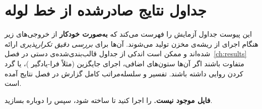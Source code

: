 \chapter{جداول نتایج صادرشده از خط لوله}
\label{app:pipeline_tables}

این پیوست جداول آزمایش را فهرست می‌کند که \textbf{به‌صورت خودکار} از خروجی‌های  زیر \texttt{} هنگام اجرای \texttt{} از ریشه‌ی مخزن تولید می‌شوند. آن‌ها برای \emph{بررسی دقیق تکرارپذیری} ارائه شده‌اند و ممکن است اندکی از جداول قالب‌بندی‌شده‌ی دستی در فصل~\ref{ch:results} متفاوت باشند اگر آن‌ها ستون‌های اضافی، اجرای جایگزین (مثلاً فرا-یادگیر )، یا گرد کردن روایی داشته باشند. تفسیر و سلسله‌مراتب کامل گزارش در فصل نتایج آمده است.

  {\begin{latin}\end{latin}}
  {\par\textbf{فایل موجود نیست.} \texttt{} را اجرا کنید تا \texttt{} ساخته شود، سپس  را دوباره بسازید.\par}
